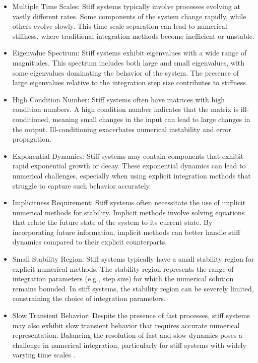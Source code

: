 \begin{itemize}
  \item Multiple Time Scales: Stiff systems typically involve processes evolving at vastly different rates. Some components of the system change rapidly, while others evolve slowly. This time scale separation can lead to numerical stiffness, where traditional integration methods become inefficient or unstable.
  
  \item Eigenvalue Spectrum: Stiff systems exhibit eigenvalues with a wide range of magnitudes. This spectrum includes both large and small eigenvalues, with some eigenvalues dominating the behavior of the system. The presence of large eigenvalues relative to the integration step size contributes to stiffness.
  
  \item High Condition Number: Stiff systems often have matrices with high condition numbers. A high condition number indicates that the matrix is ill-conditioned, meaning small changes in the input can lead to large changes in the output. Ill-conditioning exacerbates numerical instability and error propagation.
  
  \item Exponential Dynamics: Stiff systems may contain components that exhibit rapid exponential growth or decay. These exponential dynamics can lead to numerical challenges, especially when using explicit integration methods that struggle to capture such behavior accurately.
  
  \item Implicitness Requirement: Stiff systems often necessitate the use of implicit numerical methods for stability. Implicit methods involve solving equations that relate the future state of the system to its current state. By incorporating future information, implicit methods can better handle stiff dynamics compared to their explicit counterparts.
  
  \item Small Stability Region: Stiff systems typically have a small stability region for explicit numerical methods. The stability region represents the range of integration parameters (e.g., step size) for which the numerical solution remains bounded. In stiff systems, the stability region can be severely limited, constraining the choice of integration parameters.
  
  \item Slow Transient Behavior: Despite the presence of fast processes, stiff systems may also exhibit slow transient behavior that requires accurate numerical representation. Balancing the resolution of fast and slow dynamics poses a challenge in numerical integration, particularly for stiff systems with widely varying time scales \cite{enwiki:1182900519}.
\end{itemize}

